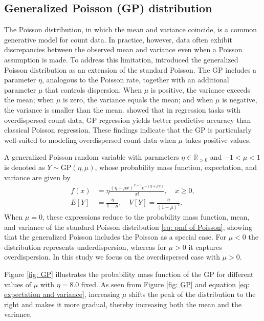 \documentclass[pdflatex,sn-basic]{sn-jnl}%
\theoremstyle{thmstyleone}%
\theoremstyle{thmstyletwo}%
\theoremstyle{thmstylethree}%
\begin{document}
\subsection{Generalized Poisson (GP) distribution}
The Poisson distribution, in which the mean and variance coincide, is a common generative model for count data. In practice, however, data often exhibit discrepancies between the observed mean and variance even when a Poisson assumption is made. To address this limitation, \citet{Consul01111973} introduced the generalized Poisson distribution as an extension of the standard Poisson. The GP includes a parameter $\eta$, analogous to the Poisson rate, together with an additional parameter $\mu$ that controls dispersion. When $\mu$ is positive, the variance exceeds the mean; when $\mu$ is zero, the variance equals the mean; and when $\mu$ is negative, the variance is smaller than the mean. \citet{yusuf2015performance} showed that in regression tasks with overdispersed count data, GP regression yields better predictive accuracy than classical Poisson regression. These findings indicate that the GP is particularly well-suited to modeling overdispersed count data when $\mu$ takes positive values.

A generalized Poisson random variable with parameters $\eta \in \mathbb{R}_{>0}$ and $-1 < \mu < 1$ is denoted as $Y \sim \mathrm{GP}(\eta, \mu)$, whose probability mass function, expectation, and variance are given by
\begin{align}
	f(x) &= \eta \frac{(\eta + \mu x)^{x-1} e^{-(\eta + \mu x)}}{x!}, \quad x \ge 0, \label{mass_GP}\\
	E[Y] &= \frac{\eta}{1-\mu}, \quad V[Y] = \frac{\eta}{(1-\mu)^3}. \label{eq: expectation and variance}
\end{align}
When $\mu = 0$, these expressions reduce to the probability mass function, mean, and variance of the standard Poisson distribution \eqref{eq: pmf of Poisson}, showing that the generalized Poisson includes the Poisson as a special case. For $\mu < 0$ the distribution represents underdispersion, whereas for $\mu > 0$ it captures overdispersion. In this study we focus on the overdispersed case with $\mu > 0$.

Figure \ref{fig: GP} illustrates the probability mass function of the GP for different values of $\mu$ with $\eta = 8.0$ fixed. As seen from Figure \ref{fig: GP} and equation \eqref{eq: expectation and variance}, increasing $\mu$ shifts the peak of the distribution to the right and makes it more gradual, thereby increasing both the mean and the variance.
\end{document}
